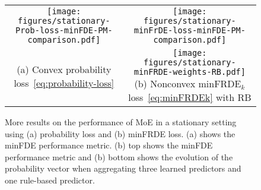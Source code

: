 \begin{figure}[h]
    \begin{minipage}{\columnwidth}
        \begin{tabular}{cc}
            \hspace{-8mm}
            \begin{minipage}{0.5\textwidth}
            \centering
            \texttt{[image: figures/stationary-Prob-loss-minFDE-PM-comparison.pdf]}
            \end{minipage}
            &
            \begin{minipage}{0.5\textwidth}
            \centering
            \texttt{[image: figures/stationary-minFrDE-loss-minFDE-PM-comparison.pdf]}
            \end{minipage}
            \\
            \hspace{-8mm}
            \begin{minipage}{0.5\textwidth}
            \centering
            \vspace{26.5mm}
            {(a) Convex probability loss~\eqref{eq:probability-loss}}
            \end{minipage}
            &
            \begin{minipage}{0.5\textwidth}
            \centering
            \texttt{[image: figures/stationary-minFRDE-weights-RB.pdf]} 
            {(b) Nonconvex minFRDE$_k$ loss~\eqref{eq:minFRDEk} with RB}
            \end{minipage}
            \\
        \end{tabular}
    \end{minipage}
    \caption{More results on the performance of MoE in a stationary setting using (a) probability loss and (b) minFRDE loss. (a) shows the minFDE performance metric. (b) top shows the minFDE performance metric and (b) bottom shows the evolution of the probability vector when aggregating three learned predictors and one rule-based predictor. 
    \label{fig:stationary-extra}}
    \vspace{2mm}
\end{figure}

